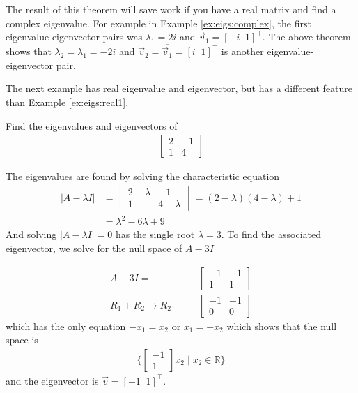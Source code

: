 The result of this theorem will save work if you have a real matrix and find a complex eigenvalue.  For example in Example \ref{ex:eigs:complex}, the first eigenvalue-eigenvector pairs was $\lambda_1=2i$ and $\vec{v}_1=[-i \; \; 1]^{\intercal}$.  The above theorem shows that $\lambda_2=\overline{\lambda_1} = -2i$ and $\vec{v}_2=\overline{\vec{v}_1} = [i \; \; 1]^{\intercal}$ is another eigenvalue-eigenvector pair.  

The next example has real eigenvalue and eigenvector, but has a different feature than Example \ref{ex:eigs:real1}.  

\begin{example}
Find the eigenvalues and eigenvectors of 
%
\begin{align*}
\begin{bmatrix}
2 & -1 \\ 1 & 4
\end{bmatrix}
\end{align*}

\solution

The eigenvalues are found by solving the characteristic equation 
%
\begin{align*}
|A-\lambda I| & = \begin{vmatrix}
2-\lambda & -1 \\ 1 & 4-\lambda
\end{vmatrix} = (2-\lambda)(4-\lambda)+1 \\
& = \lambda^2-6\lambda + 9 
\end{align*}
And solving $|A-\lambda I|=0$ has the single root $\lambda = 3$.  To find the associated eigenvector, we solve for the null space of $A-3I$ 

\begin{align*}
A-3I = & \begin{bmatrix}
-1 & -1 \\
1 & 1 
\end{bmatrix} \\
R_1 + R_2 \rightarrow R_2 \qquad & \begin{bmatrix}
-1 & -1 \\
0 & 0 
\end{bmatrix}
\end{align*}
which has the only equation $-x_1 = x_2$ or $x_1 =-x_2$ which shows that the null space is
%
\begin{align*}
\{ \begin{bmatrix}
-1 \\ 1 
\end{bmatrix} x_2 \; | \; x_2 \in \mathbb{R} \}
\end{align*}
and the eigenvector is $\vec{v} = [-1\;\; 1]^{\intercal}$.   
\end{example}

